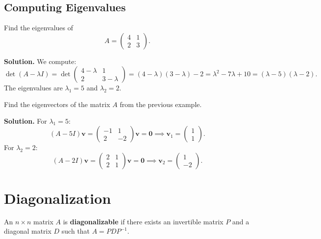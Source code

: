\documentclass[
    language=english,
    doctype=lecture-notes,
    institution=none,
]{../../omnilatex}
\begin{document}
\subsection{Computing Eigenvalues}

\begin{example}
Find the eigenvalues of
\[
    A = \begin{pmatrix} 4 & 1 \\ 2 & 3 \end{pmatrix}.
\]

\textbf{Solution.}  We compute:
\[
    \det(A - \lambda I) = \det\begin{pmatrix} 4-\lambda & 1 \\ 2 & 3-\lambda \end{pmatrix}
    = (4-\lambda)(3-\lambda) - 2 = \lambda^2 - 7\lambda + 10
    = (\lambda - 5)(\lambda - 2).
\]
The eigenvalues are $\lambda_1 = 5$ and $\lambda_2 = 2$.
\end{example}

\begin{example}
Find the eigenvectors of the matrix $A$ from the previous example.

\textbf{Solution.}  For $\lambda_1 = 5$:
\[
    (A - 5I)\mathbf{v} = \begin{pmatrix} -1 & 1 \\ 2 & -2 \end{pmatrix}\mathbf{v} = \mathbf{0}
    \implies \mathbf{v}_1 = \begin{pmatrix} 1 \\ 1 \end{pmatrix}.
\]
For $\lambda_2 = 2$:
\[
    (A - 2I)\mathbf{v} = \begin{pmatrix} 2 & 1 \\ 2 & 1 \end{pmatrix}\mathbf{v} = \mathbf{0}
    \implies \mathbf{v}_2 = \begin{pmatrix} 1 \\ -2 \end{pmatrix}.
\]
\end{example}

\section{Diagonalization}

\begin{definition}
An $n \times n$ matrix $A$ is \textbf{diagonalizable} if there exists an
invertible matrix $P$ and a diagonal matrix $D$ such that $A = PDP^{-1}$.
\end{definition}
\end{document}
